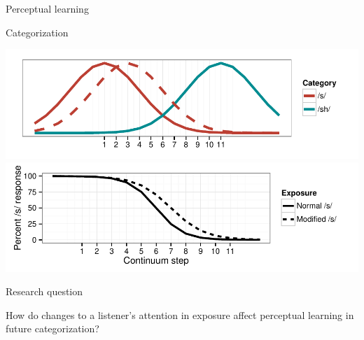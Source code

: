 \documentclass{beamer}
\begin{document}
\begin{frame}{Perceptual learning}
\hfill
{}

\end{frame}

\begin{frame}{Categorization}

\includegraphics[width=1.0\textwidth]{graphs/dist}
\vfill
\includegraphics[width=1.0\textwidth]{graphs/class}

\end{frame}

\begin{frame}{Research question}

\vfill
How do changes to a listener's attention in exposure affect perceptual learning in future categorization?
\vfill

\end{frame}
\end{document}
